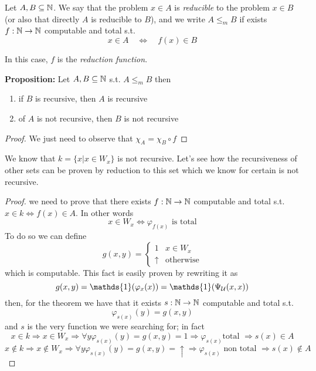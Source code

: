 \newcommand{\red}{\ensuremath{\leq_m}}
\begin{definition}
  Let $A,B \subseteq \mathbb{N}$. We say that the problem $x \in A$ is
  \emph{reducible} to the problem $x \in B$ (or also that directly $A$
  is reducible to $B$), and we write $A \red B$ if exists
  $f : \mathbb{N} \rightarrow \mathbb{N}$ computable and total s.t.
  \[x \in A \quad  \Leftrightarrow \quad f(x) \in B\]
\end{definition}
In this case, $f$ is the \emph{reduction function}.

\textbf{Proposition:} Let $A,B \subseteq \mathbb{N}$ s.t. $A \red B$ then
\begin{enumerate}[label=\arabic*)]
\item if $B$ is recursive, then $A$ is recursive
\item of $A$ is not recursive, then $B$ is not recursive
\end{enumerate}

\begin{proof}
We just need to observe that $\chi_A = \chi_B \circ f$
\end{proof}

We know that $k = \{ x | x \in W_x \}$ is not recursive. Let's see how
the recursiveness of other sets can be proven by reduction to this
set which we know for certain is not recursive.
\begin{example}
  \begin{proof}
    we need to prove that there exists $f : \mathbb{N} \rightarrow \mathbb{N}$ computable and total
    s.t. $x \in k \Leftrightarrow f(x) \in A$. In other words
    \[ x\in W_x \Leftrightarrow  \varphi_{f(x)} \mbox{ is total} \]
    To do so we can define
    \[
      g(x,y) = \begin{cases}
        1 & x\in W_x \\
        \uparrow & \mbox{otherwise}
      \end{cases}
    \]
    which is computable. This fact is easily proven by rewriting it as
    \[
      g(x,y) = \mathds{1}(\varphi_x(x)) = \mathds{1}(\univ(x,x))
    \]
    then, for the \smn theorem we have that it exists $s: \mathbb{N} \rightarrow \mathbb{N}$
    computable and total s.t. \[\varphi_{s(x)}(y) = g(x,y)\] and $s$
    is the very function we were searching for; in fact
    \[x \in k \Rightarrow x \in W_x \Rightarrow \forall y
      \varphi_{s(x)}(y) = g(x,y) = 1 \Rightarrow \varphi_{s(x)} \mbox{
        total } \Rightarrow s(x) \in A\]
    \[x \notin k \Rightarrow x \notin W_x \Rightarrow \forall y
      \varphi_{s(x)}(y) = g(x,y) = \uparrow \Rightarrow \varphi_{s(x)}
      \mbox{ non total } \Rightarrow s(x) \notin A\]
  \end{proof}
\end{example}

